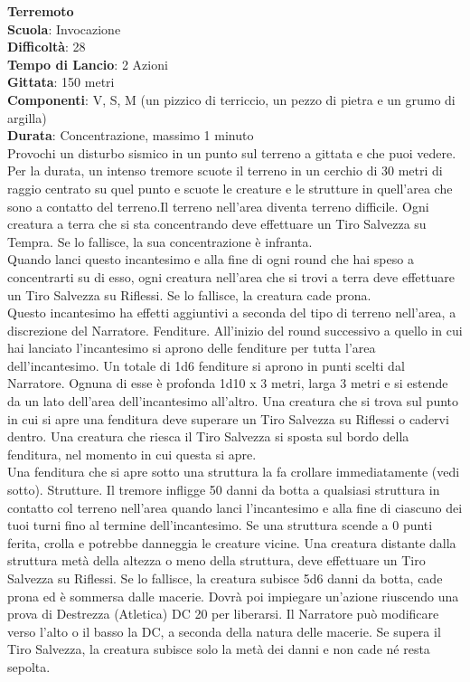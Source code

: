 \begin{multicols}{2}
\medskip\textbf{Terremoto}\\
\textbf{Scuola}: Invocazione\\
\textbf{Difficoltà}:  28\\
\textbf{Tempo di Lancio}: 2 Azioni\\
\textbf{Gittata}: 150 metri\\
\textbf{Componenti}: V, S, M (un pizzico di terriccio, un pezzo di pietra e un grumo di argilla)\\
\textbf{Durata}: Concentrazione, massimo 1 minuto\\
Provochi un disturbo sismico in un punto sul terreno a gittata e che puoi vedere. Per la durata, un intenso tremore scuote il terreno in un cerchio di 30 metri di raggio centrato su quel punto e scuote le creature e le strutture in quell'area che sono a contatto del terreno.Il terreno  nell'area diventa terreno difficile. Ogni creatura a terra che si sta concentrando deve effettuare un Tiro Salvezza su Tempra. Se lo fallisce, la sua concentrazione è infranta.\\
Quando lanci questo incantesimo e alla fine di ogni round che hai speso a concentrarti su di esso, ogni creatura nell'area che si trovi a terra deve effettuare un Tiro Salvezza su Riflessi. Se lo fallisce, la creatura cade prona.\\
Questo incantesimo ha effetti aggiuntivi a seconda del tipo di terreno nell'area, a discrezione del Narratore. Fenditure. All'inizio del round successivo a quello in cui hai lanciato l'incantesimo si aprono delle fenditure per tutta l’area dell'incantesimo. Un totale di 1d6 fenditure si aprono in punti scelti dal Narratore. Ognuna di esse è profonda 1d10 x 3 metri, larga 3 metri e si estende da un lato dell'area dell'incantesimo all'altro. Una creatura che si trova sul punto in cui si apre una fenditura deve superare un Tiro Salvezza su Riflessi o cadervi dentro. Una creatura che riesca il Tiro Salvezza si sposta sul bordo della fenditura, nel momento in cui questa si apre.\\
Una fenditura che si apre sotto una struttura la fa crollare immediatamente (vedi sotto). Strutture. Il tremore infligge 50 danni da botta a qualsiasi struttura in contatto col terreno nell'area quando lanci l'incantesimo e alla fine di ciascuno dei tuoi turni fino al termine dell'incantesimo. Se una struttura scende a 0 punti ferita, crolla e potrebbe danneggia le creature vicine. Una creatura distante dalla struttura metà della altezza o meno della struttura, deve effettuare un Tiro Salvezza su Riflessi. Se lo fallisce, la creatura subisce 5d6 danni da botta, cade prona ed è sommersa dalle macerie. Dovrà poi impiegare un'azione riuscendo una prova di Destrezza (Atletica) DC 20 per liberarsi. Il Narratore può modificare verso l’alto o il basso la DC, a seconda della natura delle macerie. Se supera il Tiro Salvezza, la creatura subisce solo la metà dei danni e non cade né resta sepolta.


\end{multicols}
